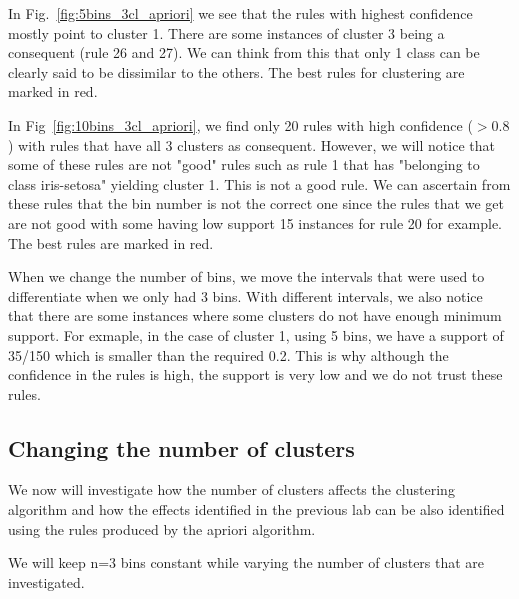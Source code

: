 \documentclass[letterpaper,12pt]{article}
\begin{document}
In Fig.~\ref{fig:5bins_3cl_apriori} we see that the rules with highest confidence mostly point to cluster 1. There are some instances of cluster 3 being a consequent (rule 26 and 27). We can think from this that only 1 class can be clearly said to be dissimilar to the others. The best rules for clustering are marked in red.

In Fig~\ref{fig:10bins_3cl_apriori}, we find only 20 rules with high confidence ($>0.8$) with rules that have all 3 clusters as consequent. However, we will notice that some of these rules are not "good" rules such as rule 1 that has "belonging to class iris-setosa" yielding cluster 1. This is not a good rule. We can ascertain from these rules that the bin number is not the correct one since the rules that we get are not good with some having low support 15 instances for rule 20 for example. The best rules are marked in red.

When we change the number of bins, we move the intervals that were used to differentiate when we only had 3 bins. With different intervals, we also notice that there are some instances where some clusters do not have enough minimum support. For exmaple, in the case of cluster 1, using 5 bins, we have a support of 35/150 which is smaller than the required 0.2. This is why although the confidence in the rules is high, the support is very low and we do not trust these rules.

\subsection{Changing the number of clusters}

We now will investigate how the number of clusters affects the clustering algorithm and how the effects identified in the previous lab can be also identified using the rules produced by the apriori algorithm.

We will keep n=3 bins constant while varying the number of clusters that are investigated.
\end{document}
